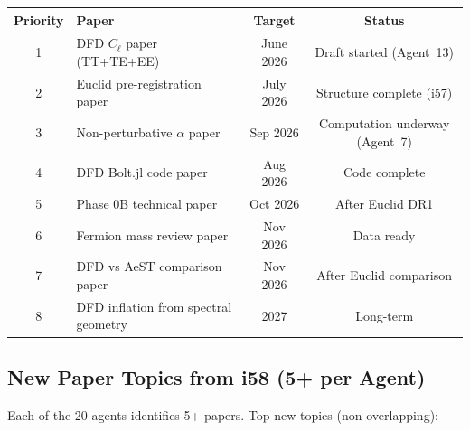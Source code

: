 \documentclass[11pt,a4paper]{article}
\begin{document}
\begin{center}
\begin{longtable}{clcc}
\toprule
\textbf{Priority} & \textbf{Paper} & \textbf{Target} & \textbf{Status} \\
\midrule
1 & DFD $C_\ell$ paper (TT+TE+EE) & June 2026 & Draft started (Agent~13) \\
2 & Euclid pre-registration paper & July 2026 & Structure complete (i57) \\
3 & Non-perturbative $\alpha$ paper & Sep 2026 & Computation underway (Agent~7) \\
4 & DFD Bolt.jl code paper & Aug 2026 & Code complete \\
5 & Phase 0B technical paper & Oct 2026 & After Euclid DR1 \\
6 & Fermion mass review paper & Nov 2026 & Data ready \\
7 & DFD vs AeST comparison paper & Nov 2026 & After Euclid comparison \\
8 & DFD inflation from spectral geometry & 2027 & Long-term \\
\bottomrule
\end{longtable}
\end{center}

\subsection{New Paper Topics from i58 (5+ per Agent)}

Each of the 20 agents identifies 5+ papers. Top new topics (non-overlapping):
\end{document}
